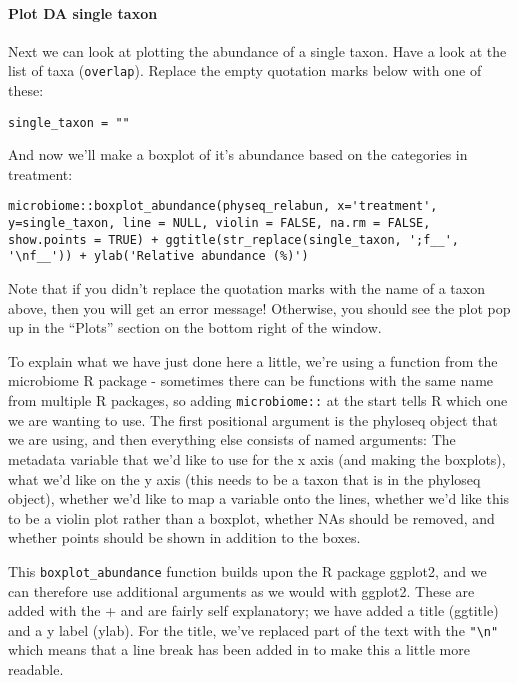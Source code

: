 \documentclass[
]{book}
\begin{document}
\paragraph{Plot DA single taxon}\label{plot-da-single-taxon}

Next we can look at plotting the abundance of a single taxon. Have a look at the list of taxa (\texttt{overlap}). Replace the empty quotation marks below with one of these:

\begin{verbatim}
single_taxon = ""
\end{verbatim}

And now we'll make a boxplot of it's abundance based on the categories in treatment:

\begin{verbatim}
microbiome::boxplot_abundance(physeq_relabun, x='treatment', y=single_taxon, line = NULL, violin = FALSE, na.rm = FALSE, show.points = TRUE) + ggtitle(str_replace(single_taxon, ';f__', '\nf__')) + ylab('Relative abundance (%)')
\end{verbatim}

Note that if you didn't replace the quotation marks with the name of a taxon above, then you will get an error message! Otherwise, you should see the plot pop up in the ``Plots'' section on the bottom right of the window.

To explain what we have just done here a little, we're using a function from the microbiome R package - sometimes there can be functions with the same name from multiple R packages, so adding \texttt{microbiome::} at the start tells R which one we are wanting to use. The first positional argument is the phyloseq object that we are using, and then everything else consists of named arguments: The metadata variable that we'd like to use for the x axis (and making the boxplots), what we'd like on the y axis (this needs to be a taxon that is in the phyloseq object), whether we'd like to map a variable onto the lines, whether we'd like this to be a violin plot rather than a boxplot, whether NAs should be removed, and whether points should be shown in addition to the boxes.

This \texttt{boxplot\_abundance} function builds upon the R package ggplot2, and we can therefore use additional arguments as we would with ggplot2. These are added with the + and are fairly self explanatory; we have added a title (ggtitle) and a y label (ylab). For the title, we've replaced part of the text with the \texttt{"\textbackslash{}n"} which means that a line break has been added in to make this a little more readable.
\end{document}
